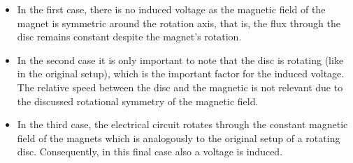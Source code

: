 
\begin{solutionblock}
    \begin{itemize}
        \item In the first case, there is no induced voltage as the magnetic field of the magnet is symmetric around the rotation axis, that is, the flux through the disc remains constant despite the magnet's rotation.
        \item In the second case it is only important to note that the disc is rotating (like in the original setup), which is the important factor for the induced voltage. The relative speed between the disc and the magnetic is not relevant due to the discussed rotational symmetry of the magnetic field.
        \item In the third case, the electrical circuit rotates through the constant magnetic field of the magnets which is analogously to the original setup of a rotating disc. Consequently, in this final case also a voltage is induced.
    \end{itemize}
\end{solutionblock}